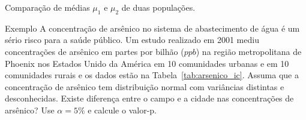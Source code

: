 \documentclass[9pt]{beamer}
\begin{document}
\begin{frame}{Comparação de médias $\mu_1$ e $\mu_2$ de duas populações.}

\begin{block}{Exemplo}
A concentração de arsênico no sistema de abastecimento de água é um sério risco para a saúde público. Um estudo realizado em 2001 	mediu concentrações de arsênico em partes por bilhão ($ppb$) na região metropolitana de Phoenix nos Estados Unido da América em 10 comunidades urbanas e em 10 comunidades rurais e os dados estão na Tabela~\ref{tab:arsenico_ic}. Assuma que a concentração de arsênico tem distribuição normal com variâncias distintas e desconhecidas. Existe diferença entre o campo e a cidade nas concentrações de arsênico? Use $\alpha=5\%$ e calcule o valor-p.
\end{block}

\begin{table}[htbp]
\centering
{}
\caption{Concentração de arsênico para 20 comunidades na região metropolitana de Phoenix.}
\label{tab:arsenico_ic}
\end{table}
\end{frame}
\end{document}
